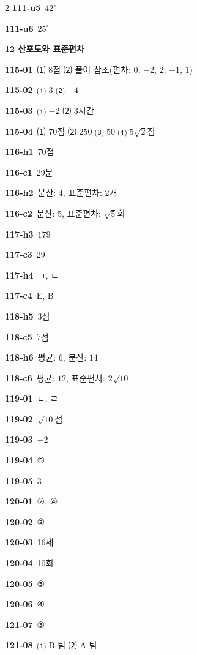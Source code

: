 \documentclass[10pt,a4paper]{article}
\newcommand{\pt}[1]{\mathrm{#1}}
\begin{document}
\begin{multicols}{2}
\noindent\textbf{111-u5}\ $42^\circ$\par
\noindent\textbf{111-u6}\ $25^\circ$\par
\noindent\textbf{12 산포도와 표준편차}\par\smallskip
\noindent\textbf{115-01}\ ⑴ 8점 ⑵ 풀이 참조(편차: $0$, $-2$, $2$, $-1$, $1$)\par
\noindent\textbf{115-02}\ ⑴ $3$ ⑵ $-4$\par
\noindent\textbf{115-03}\ ⑴ $-2$ ⑵ 3시간\par
\noindent\textbf{115-04}\ ⑴ 70점 ⑵ $250$ ⑶ $50$ ⑷ $5\sqrt{2}$점\par
\noindent\textbf{116-h1}\ 70점\par
\noindent\textbf{116-c1}\ 29분\par
\noindent\textbf{116-h2}\ 분산: $4$, 표준편차: 2개\par
\noindent\textbf{116-c2}\ 분산: $5$, 표준편차: $\sqrt{5}$회\par
\noindent\textbf{117-h3}\ $179$\par
\noindent\textbf{117-c3}\ $29$\par
\noindent\textbf{117-h4}\ ㄱ, ㄴ\par
\noindent\textbf{117-c4}\ $\pt{E}$, $\pt{B}$\par
\noindent\textbf{118-h5}\ 3점\par
\noindent\textbf{118-c5}\ 7점\par
\noindent\textbf{118-h6}\ 평균: $6$, 분산: $14$\par
\noindent\textbf{118-c6}\ 평균: $12$, 표준편차: $2\sqrt{10}$\par
\noindent\textbf{119-01}\ ㄴ, ㄹ\par
\noindent\textbf{119-02}\ $\sqrt{10}$점\par
\noindent\textbf{119-03}\ $-2$\par
\noindent\textbf{119-04}\ ⑤\par
\noindent\textbf{119-05}\ $3$\par
\noindent\textbf{120-01}\ ②, ④\par
\noindent\textbf{120-02}\ ②\par
\noindent\textbf{120-03}\ 16세\par
\noindent\textbf{120-04}\ 10회\par
\noindent\textbf{120-05}\ ⑤\par
\noindent\textbf{120-06}\ ④\par
\noindent\textbf{121-07}\ ③\par
\noindent\textbf{121-08}\ ⑴ $\pt{B}$ 팀 ⑵ $\pt{A}$ 팀\par

\end{multicols}
\end{document}
